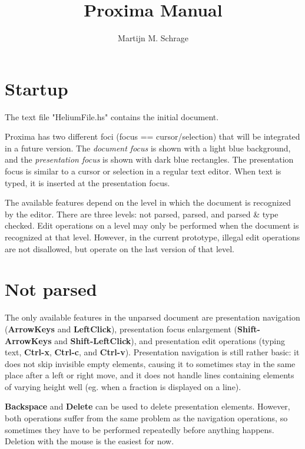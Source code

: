 \documentclass{article}
\begin{document}
\title{Proxima Manual}
\author{Martijn M. Schrage}
\maketitle

\section {Startup}

The text file "HeliumFile.hs" contains the initial document. 

Proxima has two different foci (focus == cursor/selection) that will be integrated in a future version. The {\em document focus} is shown with a light blue background, and the {\em presentation focus} is shown with dark blue rectangles. The presentation focus is similar to a cursor or selection in a regular text editor. When text is typed, it is inserted at the presentation focus.


The available features depend on the level in which the document is recognized by the editor. There are three levels: not parsed, parsed, and parsed \& type checked. Edit operations on a level may only be performed when the document is recognized at that level. However, in the current prototype, illegal edit operations are not disallowed, but operate on the last version of that level.

\section{Not parsed}

The only available features in the unparsed document are presentation navigation ({\bf ArrowKeys} and {\bf LeftClick}), presentation focus enlargement ({\bf Shift-ArrowKeys} and {\bf Shift-LeftClick}), and presentation edit operations (typing text, {\bf Ctrl-x}, {\bf Ctrl-c}, and {\bf Ctrl-v}). Presentation navigation is still rather basic: it does not skip invisible empty elements, causing it to sometimes stay in the same place after a left or right move, and it does not handle lines containing elements of varying height well (eg. when a fraction is displayed on a line).

{\bf Backspace} and {\bf Delete} can be used to delete presentation elements. However, both operations suffer from the same problem as the navigation operations, so sometimes they have to be performed repeatedly before anything happens. Deletion with the mouse is the easiest for now.
\end{document}
